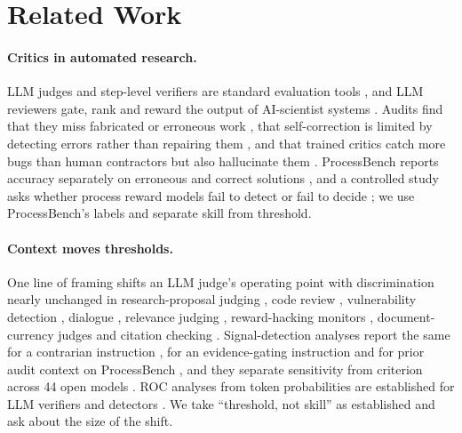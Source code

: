 \documentclass[letterpaper]{article} %
\begin{document}
\section{Related Work}
\label{sec:related}

\paragraph{Critics in automated research.} LLM judges and step-level verifiers are standard evaluation tools \citep{zheng2023judging,lightman2024verify}, and LLM reviewers gate, rank and reward the output of AI-scientist systems \citep{lu2024aiscientist,yamada2025aiscientistv2,weng2025cycleresearcher,biswas2026aaai}. Audits find that they miss fabricated or erroneous work \citep{jiang2026badscientist,son2025spot}, that self-correction is limited by detecting errors rather than repairing them \citep{huang2024cannot,tyen2024llms}, and that trained critics catch more bugs than human contractors but also hallucinate them \citep{mcaleese2024critics}. ProcessBench reports accuracy separately on erroneous and correct solutions \citep{zheng2025processbench}, and a controlled study asks whether process reward models fail to detect or fail to decide \citep{anon2026prm}; we use ProcessBench's labels and separate skill from threshold.

\paragraph{Context moves thresholds.} One line of framing shifts an LLM judge's operating point with discrimination nearly unchanged in research-proposal judging \citep{ho2026soundnessbench}, code review \citep{alexopoulos2026agrees}, vulnerability detection \citep{shahriar2026words}, dialogue \citep{rabbani2026dialdefer}, relevance judging \citep{zhang2026polite}, reward-hacking monitors \citep{kezendirane2026hacking}, document-currency judges \citep{shah2026verify} and citation checking \citep{abtahi2026sanad}. Signal-detection analyses report the same for a contrarian instruction \citep{quiroz2026criterion}, for an evidence-gating instruction \citep{basta2026correction} and for prior audit context on ProcessBench \citep{mazaheri2026prior}, and they separate sensitivity from criterion across 44 open models \citep{dong2026sensitivity}. ROC analyses from token probabilities are established for LLM verifiers and detectors \citep{anon2026zebra,cacioli2026signal,chegini2025razor}. We take ``threshold, not skill'' as established and ask about the size of the shift.
\end{document}
